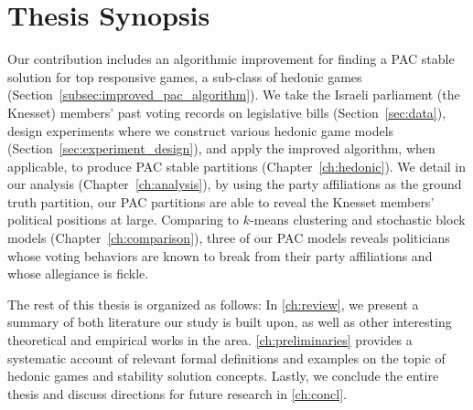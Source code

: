 \section{Thesis Synopsis}
Our contribution includes an algorithmic improvement for finding a PAC stable
solution for top responsive games, a sub-class of hedonic games
(Section~\ref{subsec:improved_pac_algorithm}).
We take the Israeli parliament (the Knesset) members' past voting records on
legislative bills (Section~\ref{sec:data}), design experiments
where we construct various hedonic game
models (Section~\ref{sec:experiment_design}), and apply the improved algorithm, when applicable, to produce PAC stable
partitions (Chapter~\ref{ch:hedonic}).
We detail in our analysis (Chapter~\ref{ch:analysis}), by using the party
affiliations as the ground truth partition, our PAC partitions are able to
reveal the Knesset members' political positions at large.
Comparing to $k$-means clustering and stochastic block models
(Chapter~\ref{ch:comparison}), three of our PAC models reveals politicians
whose voting behaviors are known to break from their party affiliations and
whose allegiance is fickle.

The rest of this thesis is organized as follows:
In \autoref{ch:review}, we present a summary of both literature our study is
built upon, as well as other interesting theoretical and empirical works in the area.
\autoref{ch:preliminaries} provides a systematic account of relevant formal
definitions and examples on the topic of hedonic games and stability solution
concepts.
Lastly, we conclude the entire thesis and discuss directions for future
research in \autoref{ch:concl}.
